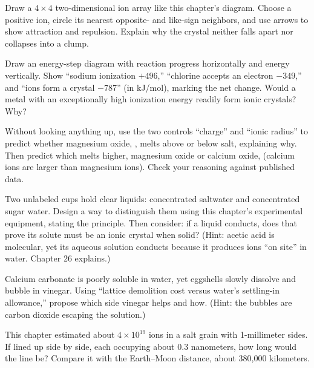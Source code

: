 \begin{sikaoti}
\item Draw a $4\times4$ two-dimensional ion array like this chapter's diagram. Choose a positive ion, circle its nearest opposite- and like-sign neighbors, and use arrows to show attraction and repulsion. Explain why the crystal neither falls apart nor collapses into a clump.
\item Draw an energy-step diagram with reaction progress horizontally and energy vertically. Show ``sodium ionization $+496$,'' ``chlorine accepts an electron $-349$,'' and ``ions form a crystal $-787$'' (in kJ/mol), marking the net change. Would a metal with an exceptionally high ionization energy readily form ionic crystals? Why?
\item Without looking anything up, use the two controls ``charge'' and ``ionic radius'' to predict whether magnesium oxide, , melts above or below salt, explaining why. Then predict which melts higher, magnesium oxide or calcium oxide,  (calcium ions are larger than magnesium ions). Check your reasoning against published data.
\item Two unlabeled cups hold clear liquids: concentrated saltwater and concentrated sugar water. Design a way to distinguish them using this chapter's experimental equipment, stating the principle. Then consider: if a liquid conducts, does that prove its solute must be an ionic crystal when solid? (Hint: acetic acid is molecular, yet its aqueous solution conducts because it produces ions ``on site'' in water. Chapter 26 explains.)
\item Calcium carbonate is poorly soluble in water, yet eggshells slowly dissolve and bubble in vinegar. Using ``lattice demolition cost versus water's settling-in allowance,'' propose which side vinegar helps and how. (Hint: the bubbles are carbon dioxide escaping the solution.)
\item This chapter estimated about $4\times10^{19}$ ions in a salt grain with 1-millimeter sides. If lined up side by side, each occupying about $0.3$ nanometers, how long would the line be? Compare it with the Earth--Moon distance, about 380,000 kilometers.
\end{sikaoti}
